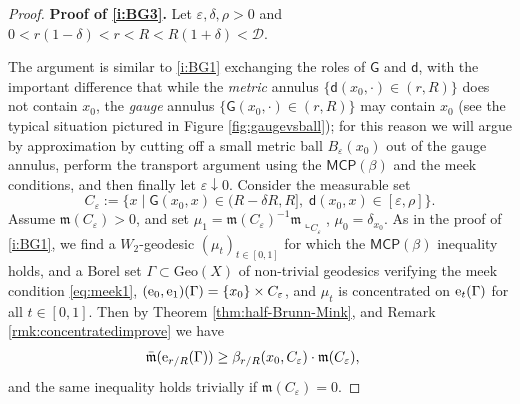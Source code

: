 \documentclass[11pt,a4paper]{article}
\theoremstyle{plain}
\theoremstyle{definition}
\theoremstyle{remark}
\numberwithin{equation}{section}
\newcommand{\ve}{\varepsilon}
\newcommand{\Geo}{\mathrm{Geo}}
\newcommand{\MCP}{\mathsf{MCP}}
\newcommand{\cD}{\mathcal{D}}
\newcommand{\mm}{\mathfrak m}
\newcommand{\ee}{{\rm e}}
\newcommand{\sfd}{\mathsf d}
\newcommand{\sfG}{\mathsf G}
\begin{document}
\begin{proof}
\textbf{Proof of \ref{i:BG3}.} Let $\ve, \delta,\rho>0$ and $0<r(1-\delta)<r<R<R(1+\delta) <\cD$.

The argument is similar to \ref{i:BG1} exchanging the roles of $\sfG$ and $\sfd$, with the important difference that while the \emph{metric} annulus $\{\sfd(x_0, \cdot)\in (r,R)\}$ does not contain $x_0$, the \emph{gauge} annulus $\{\sfG(x_0, \cdot)\in (r,R)\}$ may contain $x_0$ (see the typical situation pictured in Figure \ref{fig:gaugevsball}); for this reason we will argue by approximation by cutting off a small metric ball $B_{\ve}(x_0)$ out of the gauge annulus, perform the transport argument using the $\MCP(\beta)$ and the meek conditions, and then finally let $\ve\downarrow 0$.
 Consider the measurable set
\begin{equation}
 C_{\ve} := \{x  \mid \sfG(x_0,x) \in (R-\delta R,R],\; \sfd(x_0,x)\in [\ve, \rho] \}.
\end{equation}
Assume $\mm(C_{\ve})>0$, and set $\mu_1 = \mm( C_{\ve})^{-1}\mm\llcorner_{C_{\ve}}$, $\mu_0=\delta_{x_0}$. As in the proof of \ref{i:BG1}, we find a $W_2$-geodesic $(\mu_t)_{t\in [0,1]}$ for which the $\MCP(\beta)$ inequality holds, and a Borel set  $ \Gamma \subset \Geo(X)$ of non-trivial geodesics verifying the meek condition \eqref{eq:meek1}, $(\ee_0,\ee_1)(\Gamma) = \{x_0\}\times  C_{\ve}$, and $\mu_t$ is concentrated on $\ee_t(\Gamma)$ for all $t\in [0,1]$. Then by Theorem \ref{thm:half-Brunn-Mink}, and Remark \ref{rmk:concentratedimprove} we have
\begin{align}
\bar{\mm}(\ee_{r/R}(\Gamma)) & \geq \beta_{r/R}(x_0, C_{\ve}) \cdot \mm( C_{\ve}),
\end{align}
and the same inequality holds trivially if $\mm( C_{\ve})=0$.


\end{proof}
\end{document}
